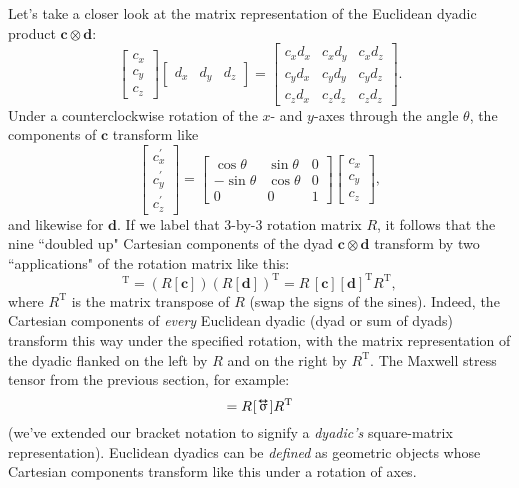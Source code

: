 \documentclass[12pt]{article}
\renewcommand{\vv}[1]{\mathbf{#1}}
\newcommand{\tightoverset}[2]{%
  \mathop{#2}\limits^{\vbox to -.5ex{\kern-0.75ex\hbox{$#1$}\vss}}}
\newcommand{\inlinedy}[1]{\tightoverset{\text{\tiny$\bm\leftrightarrow$}}{#1}}
\begin{document}
Let's take a closer look at the matrix representation of the Euclidean dyadic product $\vv c \otimes \vv d$:
\begin{equation*}
\begin{bmatrix}
c_x \\
c_y \\
c_z
\end{bmatrix}
\begin{bmatrix}
d_x & d_y & d_z
\end{bmatrix}
=
\begin{bmatrix}
c_x d_x & c_x d_y & c_x d_z \\
c_y d_x & c_y d_y & c_y d_z \\
c_z d_x & c_z d_z & c_z d_z 
\end{bmatrix} .
\end{equation*}
Under a counterclockwise rotation of the $x$- and $y$-axes through the angle $\theta$, the components of $\vv c$ transform like
\begin{equation*}
\begin{bmatrix}
c_x^\prime \\[1pt]
c_y^\prime \\[1pt]
c_z^\prime
\end{bmatrix}
=
\begin{bmatrix}
\cos \theta & \sin \theta & 0 \\
- \sin \theta & \cos \theta & 0 \\
0 & 0 & 1 
\end{bmatrix}
\begin{bmatrix}
c_x \\
c_y \\
c_z
\end{bmatrix} ,
\end{equation*}
and likewise for $\vv d$. If we label that 3-by-3 rotation matrix $R$, it follows that the nine ``doubled up" Cartesian components of the dyad $\vv c \otimes \vv d$ transform by two ``applications" of the rotation matrix like this:
\begin{equation*}
[\vv c^\prime \mkern1mu ] [\vv d^\prime \mkern1mu ]^{\mathrm{T}} = ( R [\vv c] ) ( R [\vv d] )^\mathrm{T} = R \, [\vv c] [\vv d]^{\mathrm{T}} R^{\mathrm{T}} ,
\end{equation*}
where $R^{\mathrm{T}}$ is the matrix transpose of $R$ (swap the signs of the sines). Indeed, the Cartesian components of \emph{every} Euclidean dyadic (dyad or sum of dyads) transform this way under the specified rotation, with the matrix representation of the dyadic flanked on the left by $R$ and on the right by $R^{\mathrm{T}}$. The Maxwell stress tensor from the previous section, for example:
\begin{equation*}
[ \mkern2mu {\inlinedy{\upsigma}} ^{\mkern1mu \prime} \mkern1mu ] = R \mkern1mu [\mkern1.5mu \inlinedy{\upsigma} \mkern1.5mu] R^{\mathrm{T}}
\end{equation*}
(we've extended our bracket notation to signify a \emph{dyadic's} square-matrix representation). Euclidean dyadics can be \emph{defined} as geometric objects whose Cartesian components transform like this under a rotation of axes.
\end{document}
